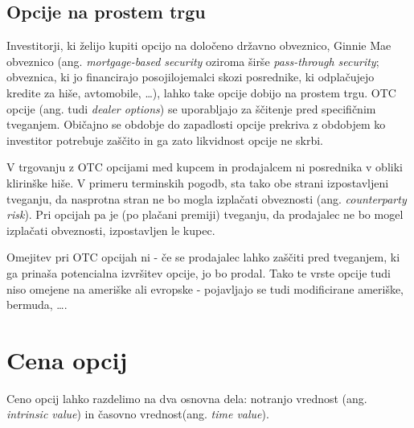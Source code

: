 \documentclass[a4paper]{article}
\begin{document}
\subsection{Opcije na prostem trgu}
Investitorji, ki želijo kupiti opcijo na določeno državno obveznico, Ginnie Mae obveznico (ang. \textit{mortgage-based security} oziroma širše \textit{pass-through security};
obveznica, ki jo financirajo posojilojemalci skozi posrednike, ki odplačujejo kredite za hiše, avtomobile, \ldots), lahko take opcije dobijo na prostem trgu.
OTC opcije (ang. tudi \textit{dealer options}) se uporabljajo za ščitenje pred specifičnim tveganjem. Običajno se obdobje do zapadlosti opcije prekriva z obdobjem 
ko investitor potrebuje zaščito in ga zato likvidnost opcije ne skrbi.

V trgovanju z OTC opcijami med kupcem in prodajalcem ni posrednika v obliki klirinške hiše. V primeru terminskih pogodb, sta tako
obe strani izpostavljeni tveganju, da nasprotna stran ne bo mogla izplačati obveznosti (ang. \textit{counterparty risk}). Pri opcijah
pa je (po plačani premiji) tveganju, da prodajalec ne bo mogel izplačati obveznosti, izpostavljen le kupec.

Omejitev pri OTC opcijah ni - če se prodajalec lahko zaščiti pred tveganjem, ki ga prinaša potencialna izvršitev opcije, jo bo prodal.
Tako te vrste opcije tudi niso omejene na ameriške ali evropske - pojavljajo se tudi modificirane ameriške, bermuda, \ldots.

\section{Cena opcij} \label{cenaopcij}
Ceno opcij lahko razdelimo na dva osnovna dela: notranjo vrednost (ang. \textit{intrinsic value}) in časovno vrednost(ang. \textit{time value}).
\end{document}
